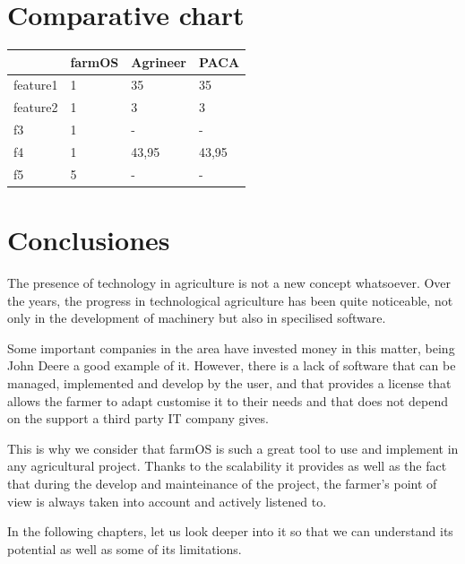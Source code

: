 \section{Comparative chart}

\begin{table}[H]
\begin{tabular}{llll}
\hline
    \rowcolor{lightpurple}
	    & \textbf{farmOS}   & \textbf{Agrineer}& \textbf{PACA} \\ \hline
    \rowcolor{lightgray}
	    feature1 & 1        & 35               & 35                              \\
	    feature2 & 1        & 3                & 3                             \\
    \rowcolor{lightgray}
	    f3       & 1        & -                & -                            \\
	    f4       & 1        & 43,95            & 43,95          \\
    \rowcolor{lightgray}
	    f5       & 5        & -                & -
\end{tabular}
\end{table}


\section{Conclusiones}
The presence of technology in agriculture is not a new concept whatsoever. Over the years, the progress in technological agriculture has been quite noticeable, not only in the development of machinery but also in specilised software.

Some important companies in the area have invested money in this matter, being John Deere a good example of it. However, there is a lack of software that can be managed, implemented and develop by the user, and that provides a license that allows the farmer to adapt customise it to their needs and that does not depend on the support a third party IT company gives.

This is why we consider that farmOS is such a great tool to use and implement in any agricultural project. Thanks to the scalability it provides as well as the fact that during the develop and mainteinance of the project, the farmer's point of view is always taken into account and actively listened to.

In the following chapters, let us look deeper into it so that we can understand its potential as well as some of its limitations.